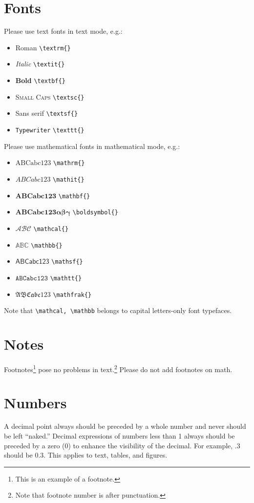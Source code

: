 \documentclass[te,nameyear,final,supplement]{econsocart}
\theoremstyle{plain}
\theoremstyle{definition}
\begin{document}
\section{Fonts}
Please use text fonts in text mode, e.g.:
\begin{itemize}
\item[]\textrm{Roman} \verb|\textrm{}|
\item[]\textit{Italic} \verb|\textit{}|
\item[]\textbf{Bold} \verb|\textbf{}|
\item[]\textsc{Small Caps} \verb|\textsc{}|
\item[]\textsf{Sans serif} \verb|\textsf{}|
\item[]\texttt{Typewriter} \verb|\texttt{}|
\end{itemize}
Please use mathematical fonts in mathematical mode, e.g.:
\begin{itemize}
\item[] $\mathrm{ABCabc123}$ \verb|\mathrm{}|
\item[] $\mathit{ABCabc123}$ \verb|\mathit{}|
\item[] $\mathbf{ABCabc123}$ \verb|\mathbf{}|
\item[] $\boldsymbol{ABCabc123\alpha\beta\gamma}$ \verb|\boldsymbol{}|
\item[] $\mathcal{ABC}$ \verb|\mathcal{}|
\item[] $\mathbb{ABC}$ \verb|\mathbb{}|
\item[] $\mathsf{ABCabc123}$ \verb|\mathsf{}| 
\item[] $\mathtt{ABCabc123}$ \verb|\mathtt{}|
\item[] $\mathfrak{ABCabc123}$ \verb|\mathfrak{}|
\end{itemize}
Note that \verb|\mathcal, \mathbb| belongs to capital letters-only font typefaces.

\section{Notes}
Footnotes\footnote{This is an example of a footnote.}
pose no problems in text.\footnote{Note that footnote number is after punctuation.} Please do not add footnotes on math. 

\section{Numbers}
A decimal point always should be preceded by a whole number and never should be left ``naked.'' Decimal expressions of numbers less than 1 always should be preceded by a zero (0) to enhance the visibility of the decimal. For example, .3 should be 0.3.   This applies to text, tables, and figures.
\end{document}
